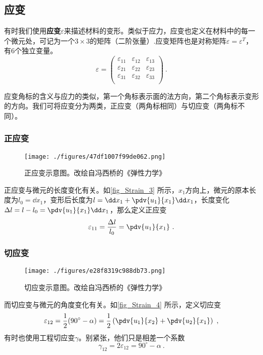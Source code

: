 \subsection{应变}
有时我们使用\textbf{应变}$\varepsilon$来描述材料的变形。类似于应力，应变也定义在材料中的每一个微元处，可记为一个$3\times3$的矩阵（二阶张量）.应变矩阵也是对称矩阵$\varepsilon=\varepsilon^T$，有$6$个独立变量。
\begin{equation}
\varepsilon = 
\begin{pmatrix}
\varepsilon_{11}&\varepsilon_{12}& \varepsilon_{13}\\
\varepsilon_{21}&\varepsilon_{22}& \varepsilon_{23}\\
\varepsilon_{31}&\varepsilon_{32}& \varepsilon_{33}\\
\end{pmatrix}~.
\end{equation}

应变角标的含义与应力的类似，第一个角标表示面的法方向，第二个角标表示变形的方向。我们可将应变分为两类，正应变（两角标相同）与切应变（两角标不同）。

\subsubsection{正应变}
\begin{figure}[ht]
\centering
\texttt{[image: ./figures/47df1007f99de062.png]}
\caption{正应变示意图。改绘自冯西桥的《弹性力学》} \label{fig_Strain_3}
\end{figure}
正应变与微元的长度变化有关。如\autoref{fig_Strain_3} 所示，$x_1$方向上，微元的原本长度为$l_0 = \dd x_1$，变形后长度为$ l =\dd x_1+\pdv{u_1}{x_1}\dd x_1$，长度变化$\Delta l = l-l_0 = \pdv{u_1}{x_1}\dd x_1$，那么定义正应变
\begin{equation}
\varepsilon_{11} = \frac{\Delta l}{l_0} =\pdv{u_1}{x_1}~.
\end{equation}

\subsubsection{切应变}
\begin{figure}[ht]
\centering
\texttt{[image: ./figures/e28f8319c988db73.png]}
\caption{切应变示意图。改绘自冯西桥的《弹性力学》} \label{fig_Strain_4}
\end{figure}
而切应变与微元的角度变化有关。如\autoref{fig_Strain_4} 所示，定义切应变
\begin{equation}
\varepsilon_{12} = \frac{1}{2}(90^\circ - \alpha) = \frac{1}{2}\left(\pdv{u_1}{x_2}+\pdv{u_2}{x_1}\right)~,
\end{equation}
有时也使用工程切应变$\gamma$。别紧张，他们只是相差一个系数
\begin{equation}
\gamma_{12} = 2\varepsilon_{12} = 90^\circ - \alpha~.
\end{equation}

